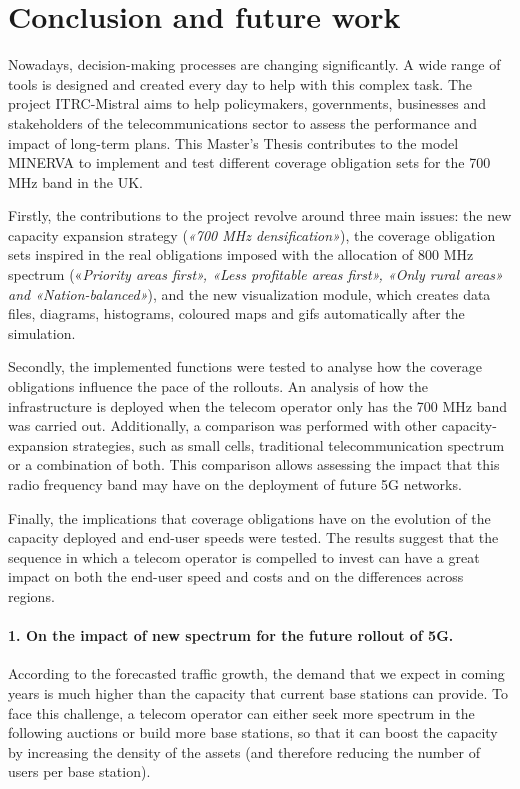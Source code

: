 \chapter{Conclusion and future work}


Nowadays, decision-making processes are changing significantly. A wide range of tools is designed and created every day to help with this complex task. The project ITRC-Mistral aims to help policymakers, governments, businesses and stakeholders of the telecommunications sector to assess the performance and impact of long-term plans. This Master’s Thesis contributes to the model MINERVA to implement and test different coverage obligation sets for the 700 MHz band in the UK. \par

Firstly, the contributions to the project revolve around three main issues: the new capacity expansion strategy (\textit{«700 MHz densification»}), the coverage obligation sets inspired in the real obligations imposed with the allocation of 800 MHz spectrum («\textit{Priority areas first», «Less profitable areas first», «Only rural areas» and «Nation-balanced»}), and the new visualization module, which creates data files, diagrams, histograms, coloured maps and gifs automatically after the simulation.\par

Secondly, the implemented functions were tested to analyse how the coverage obligations influence the pace of the rollouts. An analysis of how the infrastructure is deployed when the telecom operator only has the 700 MHz band was carried out. Additionally, a comparison was performed with other capacity-expansion strategies, such as small cells, traditional telecommunication spectrum or a combination of both. This comparison allows assessing the impact that this radio frequency band may have on the deployment of future 5G networks.\par

Finally, the implications that coverage obligations have on the evolution of the capacity deployed and end-user speeds were tested. The results suggest that the sequence in which a telecom operator is compelled to invest can have a great impact on both the end-user speed and costs and on the differences across regions.\par




\subsubsection*{1. On the impact of new spectrum for the future rollout of 5G.}
According to the forecasted traffic growth, the demand that we expect in coming years is much higher than the capacity that current base stations can provide. To face this challenge, a telecom operator can either seek more spectrum in the following auctions or build more base stations, so that it can boost the capacity by increasing the density of the assets (and therefore reducing the number of users per base station).\par

